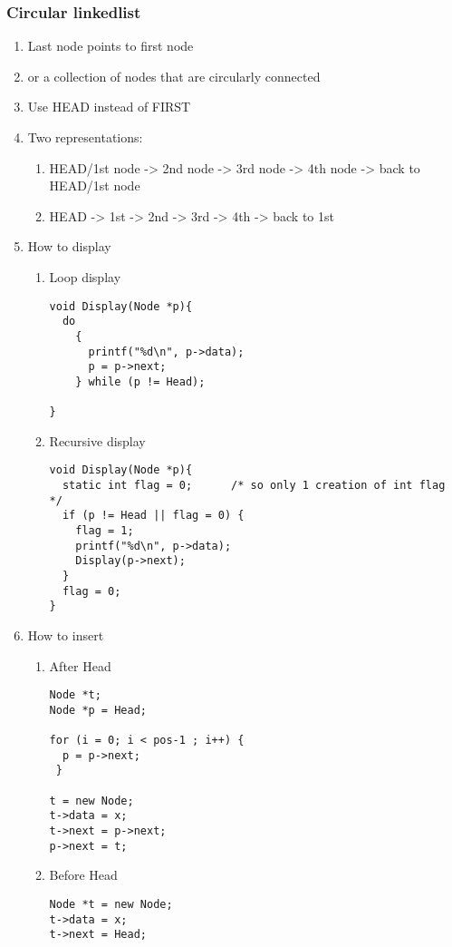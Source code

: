\documentclass[11pt]{article}
\begin{document}
\subsubsection{Circular linkedlist}
\label{sec:org33fd30e}
\begin{enumerate}
\item Last node points to first node
\label{sec:org8155811}
\item or a collection of nodes that are circularly connected
\label{sec:org9f1922e}
\item Use HEAD instead of FIRST
\label{sec:org88c449d}
\item Two representations:
\label{sec:org469194a}
\begin{enumerate}
\item HEAD/1st node -> 2nd node -> 3rd node -> 4th node -> back to HEAD/1st node
\label{sec:org261123c}
\item HEAD -> 1st -> 2nd -> 3rd -> 4th -> back to 1st
\label{sec:org78a90f3}
\end{enumerate}
\item How to display
\label{sec:org457afa6}
\begin{enumerate}
\item Loop display
\label{sec:org27c8afa}
\begin{verbatim}
void Display(Node *p){
  do
    {
      printf("%d\n", p->data);
      p = p->next;
    } while (p != Head);

}
\end{verbatim}
\item Recursive display
\label{sec:org51b426b}
\begin{verbatim}
void Display(Node *p){
  static int flag = 0;		/* so only 1 creation of int flag */
  if (p != Head || flag = 0) {
    flag = 1;
    printf("%d\n", p->data);
    Display(p->next);
  }
  flag = 0;
}
\end{verbatim}
\end{enumerate}
\item How to insert
\label{sec:orgd6b1efb}
\begin{enumerate}
\item After Head
\label{sec:org156eb32}
\begin{verbatim}
Node *t;
Node *p = Head;

for (i = 0; i < pos-1 ; i++) {
  p = p->next;
 }

t = new Node;
t->data = x;
t->next = p->next;
p->next = t;
\end{verbatim}
\item Before Head
\label{sec:orgcf9bcda}
\begin{verbatim}
Node *t = new Node;
t->data = x;
t->next = Head;


\end{verbatim}
\end{enumerate}
\end{enumerate}
\end{document}
